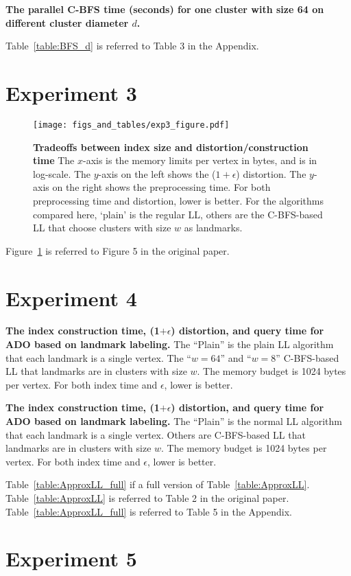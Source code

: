 \documentclass{article}
\begin{document}
\begin{table}[htbp]
  \centering
  \footnotesize
  
  \caption{
    \small\textbf{The parallel C-BFS time (seconds) for one cluster with size 64 on different cluster diameter $d$.} 
    \label{table:BFS_d}
  }
\end{table}
Table~\ref{table:BFS_d} is referred to Table 3 in the Appendix. 

\section{Experiment 3}
\begin{figure}
  \centering
  \texttt{[image: figs\_and\_tables/exp3\_figure.pdf]}    \caption{\small \textbf{Tradeoffs between index size and distortion/construction time}
  The $x$-axis is the memory limits per vertex in bytes, and is in log-scale. The $y$-axis on the left shows the ($1+\epsilon$) distortion.  The $y$-axis on the right shows the preprocessing time. For both preprocessing time and
  distortion, lower is better. For the algorithms compared here, `plain' is the regular LL, others are the C-BFS-based LL that choose clusters with size $w$ as landmarks.
  \label{fig:approx}
  }
\end{figure} 

Figure~\ref{fig:approx} is referred to Figure 5 in the original paper.

\section{Experiment 4}

\begin{table}[htbp]
  \centering
  \footnotesize
  
  \caption{
    \small\textbf{The index construction time, (1$+\epsilon$) distortion, and query time for ADO
    based on landmark labeling.} The ``Plain'' is the plain LL algorithm that each landmark is a single vertex. The ``$w=64$'' and ``$w=8$'' C-BFS-based LL that landmarks are in clusters with size $w$.
    The memory budget is 1024 bytes per vertex. For both index time and $\epsilon$, lower is better. 
    \label{table:ApproxLL}
  }
\end{table}

\begin{table}[htbp]
  \centering
  \small
  
  \caption{
    \small\textbf{The index construction time, (1$+\epsilon$) distortion, and query time for ADO
    based on landmark labeling.} The ``Plain'' is the normal LL algorithm that each landmark is a single vertex. Others are C-BFS-based LL that landmarks are in clusters with size $w$.
    The memory budget is 1024 bytes per vertex. For both index time and $\epsilon$, lower is better. 
    \label{table:ApproxLL_full}
  }
\end{table}

Table~\ref{table:ApproxLL_full} if a full version of Table~\ref{table:ApproxLL}.  Table~\ref{table:ApproxLL} is referred to Table 2 in the original paper. Table~\ref{table:ApproxLL_full} is referred to Table 5 in the Appendix.

\section{Experiment 5}
\end{document}

